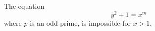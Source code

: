\begin{proposition}\label{eq:169}
    The equation
\[
    y^2+1=x^m
\]
    where $p$ is an odd prime, is impossible for $x>1$.
\end{proposition}
